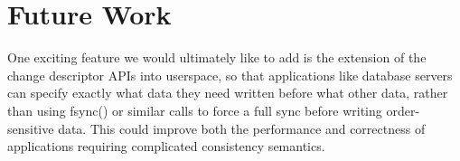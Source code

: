 \preparagraphspacing{}
\section*{Future Work}
\label{sec:future}

One exciting feature we would ultimately like to add is the extension of the
change descriptor APIs into userspace, so that applications like database
servers can specify exactly what data they need written before what other data,
rather than using fsync() or similar calls to force a full sync before writing
order-sensitive data. This could improve both the performance and correctness of
applications requiring complicated consistency semantics.
